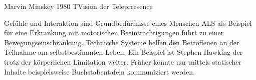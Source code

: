 Marvin Minskey 1980 TVision der Teleprresence


Gefühle und Interaktion sind Grundbedürfnisse eines Menschen
ALS als Beispiel für eine Erkrankung mit motorischen Beeinträchtigungen führt zu einer Bewegungseinschränkung.
Technische Systeme helfen den Betroffenen an der Teilnahme am selbstbestimmten Leben. Ein Beispiel ist Stephen Hawking der trotz der körperlichen Limitation weiter. Früher konnte nur mittels statischer Inhalte beispielsweise Buchstabentafeln kommuniziert werden. 


